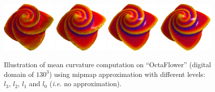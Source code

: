 \documentclass{llncs}
\newcommand{\ie}{\emph{i.e.}\xspace}
\begin{document}
\begin{figure}[!b]
  \vspace{-0.35cm}
  \begin{center}
   {\includegraphics[width=2.7cm]{figs/octa_r10_l3_a}}
   {\includegraphics[width=2.7cm]{figs/octa_r10_l2_a}}
   {\includegraphics[width=2.7cm]{figs/octa_r10_l1_a}}
   {\includegraphics[width=2.7cm]{figs/octa_r10_l0_a}}
  \end{center}
  \vspace{-0.35cm}
  \caption{Illustration of mean curvature computation on ``OctaFlower'' (digital domain of $130^3$) using mipmap approximation with different levels: $l_3$, $l_2$, $l_1$ and $l_0$ (\ie no approximation).
  }\label{fig:refine}
  \vspace{-0.35cm}
\end{figure}
\end{document}
